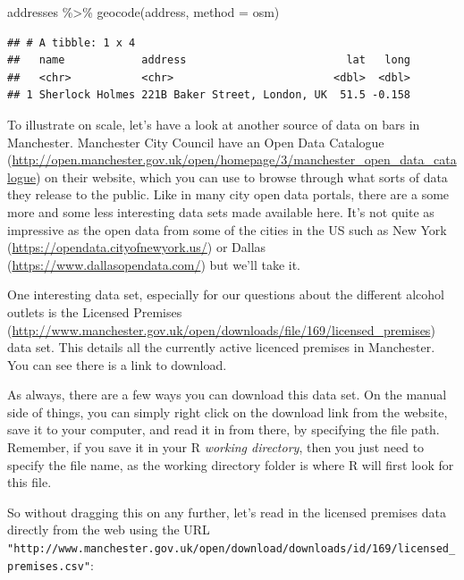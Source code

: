 \documentclass[
]{book}
\makeatletter
\newenvironment{Shaded}{\begin{snugshade}}{\end{snugshade}}
\newcommand{\AttributeTok}[1]{\textcolor[rgb]{0.61,0.61,0.61}{#1}}
\newcommand{\FunctionTok}[1]{\textcolor[rgb]{0,0,0}{#1}}
\newcommand{\NormalTok}[1]{#1}
\newcommand{\SpecialCharTok}[1]{\textcolor[rgb]{0,0,0}{#1}}
\newcommand{\StringTok}[1]{\textcolor[rgb]{0.5,0.5,0.5}{#1}}
\newenvironment{kframe}{%
\medskip{}
\setlength{\fboxsep}{.8em}
 \def\at@end@of@kframe{}%
 \ifinner\ifhmode%
  \def\at@end@of@kframe{\end{minipage}}%
  \begin{minipage}{\columnwidth}%
 \fi\fi%
 \def\FrameCommand##1{\hskip\@totalleftmargin \hskip-\fboxsep
 \colorbox{shadecolor}{##1}\hskip-\fboxsep
     \hskip-\linewidth \hskip-\@totalleftmargin \hskip\columnwidth}%
 \MakeFramed {\advance\hsize-\width
   \@totalleftmargin\z@ \linewidth\hsize
   \@setminipage}}%
 {\par\unskip\endMakeFramed%
 \at@end@of@kframe}
\renewenvironment{Shaded}{\begin{kframe}}{\end{kframe}}
\makeatother
\begin{document}
\begin{Shaded}
\begin{Highlighting}[]
\NormalTok{addresses }\SpecialCharTok{\%\textgreater{}\%} 
  \FunctionTok{geocode}\NormalTok{(address, }\AttributeTok{method =} \StringTok{\textquotesingle{}osm\textquotesingle{}}\NormalTok{)}
\end{Highlighting}
\end{Shaded}

\begin{verbatim}
## # A tibble: 1 x 4
##   name            address                         lat   long
##   <chr>           <chr>                         <dbl>  <dbl>
## 1 Sherlock Holmes 221B Baker Street, London, UK  51.5 -0.158
\end{verbatim}

To illustrate on scale, let's have a look at another source of data on bars in Manchester. Manchester City Council have an Open Data Catalogue (\url{http://open.manchester.gov.uk/open/homepage/3/manchester_open_data_catalogue}) on their website, which you can use to browse through what sorts of data they release to the public. Like in many city open data portals, there are a some more and some less interesting data sets made available here. It's not quite as impressive as the open data from some of the cities in the US such as New York (\url{https://opendata.cityofnewyork.us/}) or Dallas (\url{https://www.dallasopendata.com/}) but we'll take it.

One interesting data set, especially for our questions about the different alcohol outlets is the Licensed Premises (\url{http://www.manchester.gov.uk/open/downloads/file/169/licensed_premises}) data set. This details all the currently active licenced premises in Manchester. You can see there is a link to download.

As always, there are a few ways you can download this data set. On the manual side of things, you can simply right click on the download link from the website, save it to your computer, and read it in from there, by specifying the file path. Remember, if you save it in your R \emph{working directory}, then you just need to specify the file name, as the working directory folder is where R will first look for this file.

So without dragging this on any further, let's read in the licensed premises data directly from the web using the URL \texttt{"http://www.manchester.gov.uk/open/download/downloads/id/169/licensed\_premises.csv"}:
\end{document}

